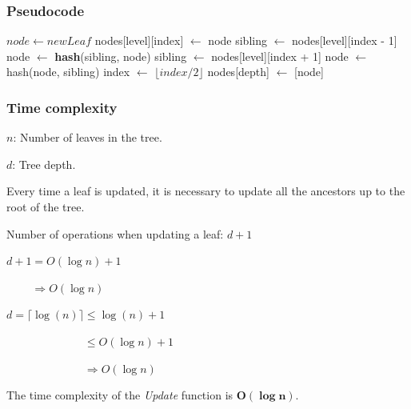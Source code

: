 \documentclass{article}
\begin{document}
\subsubsection{Pseudocode}

\begin{algorithm}[H]
    \caption{LeanIMT Update algorithm}\label{update}
    \begin{algorithmic}[1]
        \State $node\gets newLeaf$
        \State nodes[level][index] $\gets$ node
         
        \State sibling $\gets$ nodes[level][index - 1]
        \State node $\gets$ \textbf{hash}(sibling, node)
        \Else {}
        \State sibling $\gets$ nodes[level][index + 1]
         
        \State node $\gets$ hash(node, sibling)
        \EndIf
        \EndIf
        \State index $\gets$ $\lfloor index/2 \rfloor$ 
        \EndFor
        \State nodes[depth] $\gets$ [node] 
        \EndProcedure
    \end{algorithmic}
\end{algorithm}


\subsubsection{Time complexity}
\label{sec:update-time-complexity}

$n$: Number of leaves in the tree.

$d$: Tree depth.

Every time a leaf is updated, it is necessary to update all the ancestors up to the root of the tree.

\label{UpdateTimeComplexity}
Number of operations when updating a leaf: $d + 1$

$d + 1 = O(\log n) + 1$

$\phantom{d + 1} \Rightarrow \boxed{O(\log n)}$

$d = \lceil \log (n) \rceil \leq \log (n) + 1$

$\phantom{d = \lceil \log (n) \rceil} \leq O(\log n) + 1$

$\phantom{d = \lceil \log (n) \rceil} \Rightarrow O(\log n)$

The time complexity of the \textit{Update} function is $\boldsymbol{O(\log n)}$.
\end{document}

